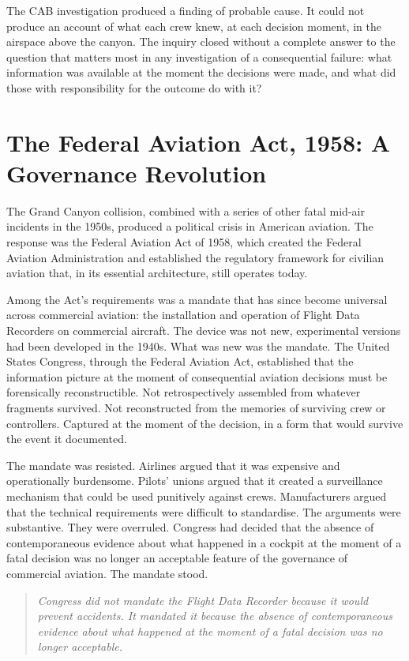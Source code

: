 The CAB investigation produced a finding of probable cause. It could not produce an account of what each crew knew, at each decision moment, in the airspace above the canyon. The inquiry closed without a complete answer to the question that matters most in any investigation of a consequential failure: what information was available at the moment the decisions were made, and what did those with responsibility for the outcome do with it?

\scenebreak

\section{The Federal Aviation Act, 1958: A Governance Revolution}

The Grand Canyon collision, combined with a series of other fatal mid-air incidents in the 1950s, produced a political crisis in American aviation. The response was the Federal Aviation Act of 1958, which created the Federal Aviation Administration and established the regulatory framework for civilian aviation that, in its essential architecture, still operates today.

Among the Act's requirements was a mandate that has since become universal across commercial aviation: the installation and operation of Flight Data Recorders on commercial aircraft. The device was not new, experimental versions had been developed in the 1940s. What was new was the mandate. The United States Congress, through the Federal Aviation Act, established that the information picture at the moment of consequential aviation decisions must be forensically reconstructible. Not retrospectively assembled from whatever fragments survived. Not reconstructed from the memories of surviving crew or controllers. Captured at the moment of the decision, in a form that would survive the event it documented.

The mandate was resisted. Airlines argued that it was expensive and operationally burdensome. Pilots' unions argued that it created a surveillance mechanism that could be used punitively against crews. Manufacturers argued that the technical requirements were difficult to standardise. The arguments were substantive. They were overruled. Congress had decided that the absence of contemporaneous evidence about what happened in a cockpit at the moment of a fatal decision was no longer an acceptable feature of the governance of commercial aviation. The mandate stood.

\begin{quote}
\emph{Congress did not mandate the Flight Data Recorder because it would prevent accidents. It mandated it because the absence of contemporaneous evidence about what happened at the moment of a fatal decision was no longer acceptable.}
\end{quote}

